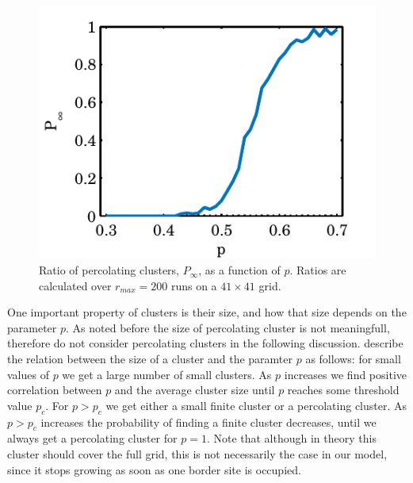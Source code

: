 \begin{figure}[b!]
	\centering
	\includegraphics[width=\columnwidth]{./img/assignment_a_p_infinite_ratio_p.pdf}
	\caption{Ratio of percolating clusters, $P_\infty$, as a function of $p$. Ratios are calculated over $r_{max} = 200$ runs on a $41 \times 41$ grid.}
	\label{fig:experiment:prob:p_inf_ratio}
\end{figure}



One important property of clusters is their size, and how that size depends on the parameter $p$. As noted before the size of percolating cluster is not meaningfull, therefore do not consider percolating clusters in the following discussion. \textcite{kenzel1997physics} describe the relation between the size of a cluster and the paramter $p$ as follows: for small values of $p$ we get a large number of small clusters. As $p$ increases we find positive correlation between $p$ and the average cluster size until $p$ reaches some threshold value $p_c$. For $p > p_c$ we get either a small finite cluster or a percolating cluster. As $p > p_c$ increases the probability of finding a finite cluster decreases, until we always get a percolating cluster for $p =1 $. Note that although in theory this cluster should cover the full grid, this is not necessarily the case in our model, since it stops growing as soon as one border site is occupied.\\

